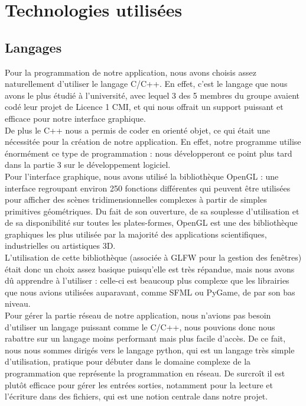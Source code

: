 \documentclass{report}
\begin{document}

\chapter{Technologies utilisées}
\section{Langages}
Pour la programmation de notre application, nous avons choisis assez naturellement d'utiliser le langage C/C++. En effet, c'est le langage que nous avons le plus étudié à l'université, avec lequel 3 des 5 membres du groupe avaient codé leur projet de Licence 1 CMI, et qui nous offrait un support puissant et efficace pour notre interface graphique. \\
De plus le C++ nous a permis de coder en orienté objet, ce qui était une nécessitée pour la création de notre application. En effet, notre programme utilise énormément ce type de programmation : nous développeront ce point plus tard dans la partie 3 sur le développement logiciel. \\

Pour l'interface graphique, nous avons utilisé la bibliothèque OpenGL : une interface regroupant environ 250 fonctions différentes qui peuvent être utilisées pour afficher des scènes tridimensionnelles complexes à partir de simples primitives géométriques. Du fait de son ouverture, de sa souplesse d'utilisation et de sa disponibilité sur toutes les plates-formes, OpenGL est une des bibliothèque graphiques les plus utilisée par la majorité des applications scientifiques, industrielles ou artistiques 3D. \\
L'utilisation de cette bibliothèque (associée à GLFW pour la gestion des fenêtres) était donc un choix assez basique puisqu'elle est très répandue, mais nous avons dû apprendre à l'utiliser : celle-ci est beaucoup plus complexe que les librairies que nous avions utilisées auparavant, comme SFML ou PyGame, de par son bas niveau. \\

Pour gérer la partie réseau de notre application, nous n'avions pas besoin d'utiliser un langage puissant comme le C/C++, nous pouvions donc nous rabattre sur un langage moins performant mais plus facile d'accès.
De ce fait, nous nous sommes dirigés vers le langage python, qui est un langage très simple d'utilisation, pratique pour débuter dans le domaine complexe de la programmation que représente la programmation en réseau. De surcroît il est plutôt efficace pour gérer les entrées sorties, notamment pour la lecture et l'écriture dans des fichiers, qui est une notion centrale dans notre projet.\\
\end{document}
